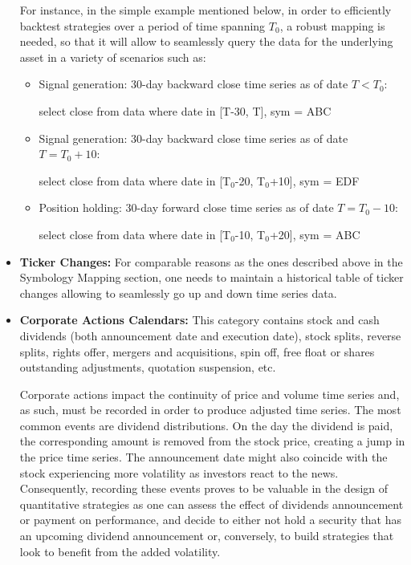 \begin{itemize}
For instance, in the simple example mentioned below, in order to efficiently backtest strategies over a period of time spanning $T_0$, a robust mapping is needed, so that it will allow to seamlessly query the data for the underlying asset in a variety of scenarios such as:

\begin{itemize}
\item Signal generation: 30-day backward close time series as of date $T < T_0$: \par
{\small \ttfamily select close from data where date in [T-30,  T], sym = ABC}

\item Signal generation: 30-day backward close time series as of date $T= T_0+10$: \par
{\small \ttfamily select close from data where date in [T$_0$-20, T$_0$+10], sym = EDF}

\item Position holding: 30-day forward close time series as of date $T= T_0-10$: \par
{\small \ttfamily select close from data where date in [T$_0$-10,  T$_0$+20], sym = ABC}
\end{itemize}

\item \textbf{Ticker Changes:} For comparable reasons as the ones described above in the Symbology Mapping section, one needs to maintain a historical table of ticker changes allowing to seamlessly go up and down time series data. 

\item \textbf{Corporate Actions Calendars:} This category contains stock and cash dividends (both announcement date and execution date), stock splits, reverse splits, rights offer, mergers and acquisitions, spin off, free float or shares outstanding adjustments, quotation suspension, etc.


Corporate actions impact the continuity of price and volume time series and, as such, must be recorded in order to produce adjusted time series. The most common events are dividend distributions. On the day the dividend is paid, the corresponding amount is removed from the stock price, creating a jump in the price time series. The announcement date might also coincide with the stock experiencing more volatility as investors react to the news. Consequently, recording these events proves to be valuable in the design of quantitative strategies as one can assess the effect of dividends announcement or payment on performance, and decide to either not hold a security that has an upcoming dividend announcement or, conversely, to build strategies that look to benefit from the added volatility. 



\end{itemize}

